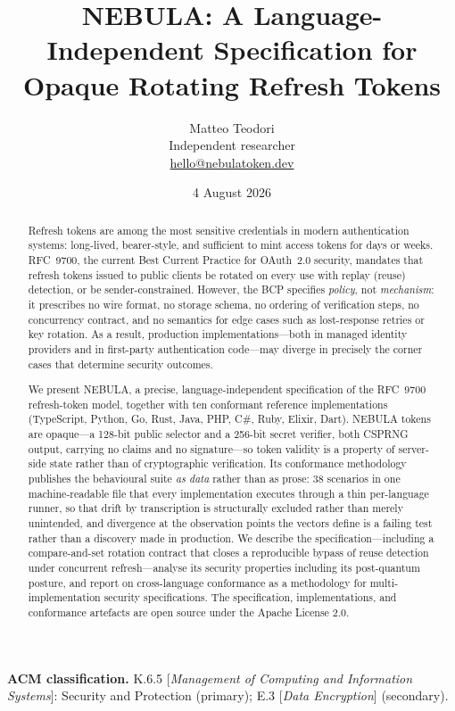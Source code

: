 \documentclass[11pt]{article}
\title{NEBULA: A Language-Independent Specification for\\Opaque Rotating Refresh Tokens}
\author{Matteo Teodori\\\small Independent researcher\\\small
  \href{mailto:hello@nebulatoken.dev}{hello@nebulatoken.dev}}
\date{4 August 2026}
\begin{document}
\maketitle

\begin{abstract}
Refresh tokens are among the most sensitive credentials in modern
authentication systems: long-lived, bearer-style, and sufficient to mint
access tokens for days or weeks. RFC~9700, the current Best Current Practice
for OAuth~2.0 security, mandates that refresh tokens issued to public clients
be rotated on every use with replay (reuse) detection, or be
sender-constrained. However, the BCP
specifies \emph{policy}, not \emph{mechanism}: it prescribes no wire format,
no storage schema, no ordering of verification steps, no concurrency
contract, and no semantics for edge cases such as lost-response retries or
key rotation. As a result, production implementations---both in managed
identity providers and in first-party authentication code---may diverge in
precisely the corner cases that determine security outcomes.

We present NEBULA, a precise, language-independent specification of the
RFC~9700 refresh-token model, together with ten conformant reference
implementations (TypeScript, Python, Go, Rust, Java, PHP, C\#, Ruby, Elixir,
Dart). NEBULA tokens are opaque---a 128-bit public selector and a 256-bit
secret verifier, both CSPRNG output, carrying no claims and no
signature---so token validity is a property of server-side
state rather than of cryptographic verification. Its conformance methodology
publishes the behavioural suite \emph{as data} rather than as prose: 38
scenarios in one machine-readable file that every implementation executes
through a thin per-language runner, so that drift by transcription is
structurally excluded rather than merely unintended, and divergence at the
observation points the vectors define is a failing test rather than a
discovery made in production. We
describe the specification---including a compare-and-set rotation contract
that closes a reproducible bypass of reuse detection under concurrent
refresh---analyse its security properties including its post-quantum
posture, and report on cross-language conformance as a methodology for
multi-implementation security specifications. The specification,
implementations, and conformance artefacts are open source under the Apache
License 2.0.
\end{abstract}

\noindent\textbf{ACM classification.}\; K.6.5 [\emph{Management of Computing
and Information Systems}]: Security and Protection (primary);
E.3 [\emph{Data Encryption}] (secondary).
\end{document}
